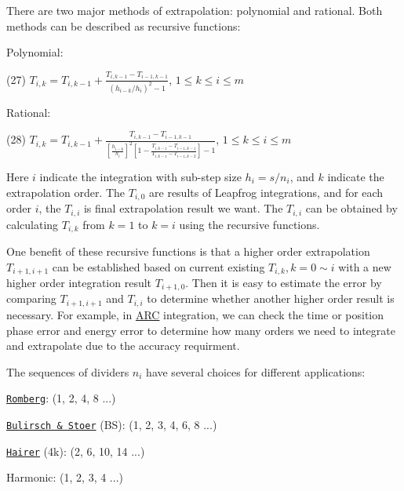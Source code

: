 There are two major methods of extrapolation\+: polynomial and rational. Both methods can be described as recursive functions\+:


\begin{DoxyItemize}
\item Polynomial\+:
\end{DoxyItemize}

(27) $ T_{i,k} = T_{i,k-1} + \frac{T_{i,k-1} - T_{i-1,k-1}}{( h_{i-k} / {h_i} )^2 -1} $, $ 1 \le k \le i \le m $


\begin{DoxyItemize}
\item Rational\+:
\end{DoxyItemize}

(28) $ T_{i,k} = T_{i,k-1} + \frac{T_{i,k-1} - T_{i-1,k-1}}{\left[ \frac{h_{i-k}}{h_i} \right]^2 \left[ 1 - \frac{T_{i,k-1} - T_{i-1,k-1}}{T_{i,k-1}- T_{i-1,k-2}} \right]-1} $, $ 1 \le k \le i \le m $

Here $ i$ indicate the integration with sub-\/step size $ h_i = s/n_i$, and $ k $ indicate the extrapolation order. The $ T_{i,0} $ are results of Leapfrog integrations, and for each order $ i$, the $ T_{i,i} $ is final extrapolation result we want. The $ T_{i,i} $ can be obtained by calculating $ T_{i,k} $ from $ k=1 $ to $ k=i $ using the recursive functions.

One benefit of these recursive functions is that a higher order extrapolation $ T_{i+1,i+1} $ can be established based on current existing $ T_{i,k}, k=0\sim i $ with a new higher order integration result $ T_{i+1,0} $. Then it is easy to estimate the error by comparing $ T_{i+1,i+1} $ and $ T_{i,i} $ to determine whether another higher order result is necessary. For example, in \hyperlink{namespaceARC}{A\+RC} integration, we can check the time or position phase error and energy error to determine how many orders we need to integrate and extrapolate due to the accuracy requirment.

The sequences of dividers $ n_i $ have several choices for different applications\+:
\begin{DoxyItemize}
\item \href{https://en.wikipedia.org/wiki/Romberg's_method}{\tt Romberg}\+: (1, 2, 4, 8 ...)
\item \href{http://link.springer.com/article/10.1007%2FBF02165234}{\tt Bulirsch \& Stoer} (BS)\+: (1, 2, 3, 4, 6, 8 ...)
\item \href{http://link.springer.com/article/10.1007%2FBF01385634}{\tt Hairer} (4k)\+: (2, 6, 10, 14 ...)
\item Harmonic\+: (1, 2, 3, 4 ...)
\end{DoxyItemize}

